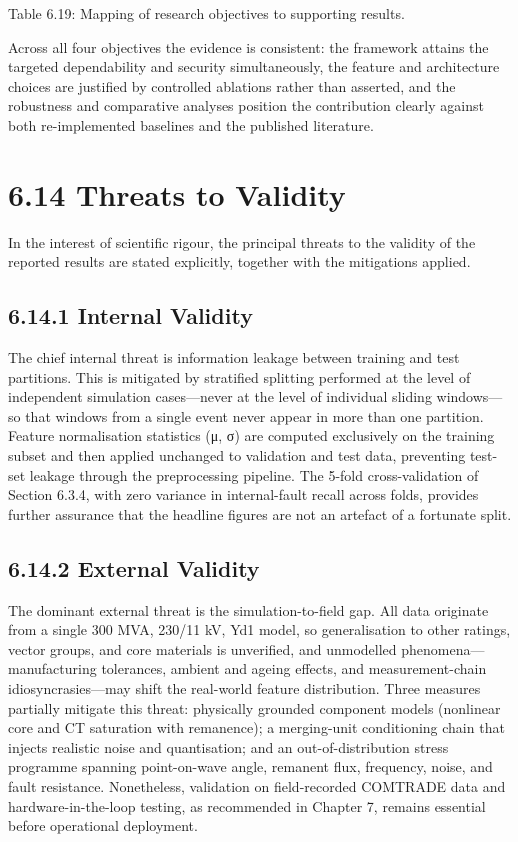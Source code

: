 Table 6.19: Mapping of research objectives to supporting results.

Across all four objectives the evidence is consistent: the framework attains the targeted dependability and security simultaneously, the feature and architecture choices are justified by controlled ablations rather than asserted, and the robustness and comparative analyses position the contribution clearly against both re-implemented baselines and the published literature.


\section{6.14  Threats to Validity}
In the interest of scientific rigour, the principal threats to the validity of the reported results are stated explicitly, together with the mitigations applied.


\subsection{6.14.1  Internal Validity}
The chief internal threat is information leakage between training and test partitions. This is mitigated by stratified splitting performed at the level of independent simulation cases---never at the level of individual sliding windows---so that windows from a single event never appear in more than one partition. Feature normalisation statistics (μ, σ) are computed exclusively on the training subset and then applied unchanged to validation and test data, preventing test-set leakage through the preprocessing pipeline. The 5-fold cross-validation of Section 6.3.4, with zero variance in internal-fault recall across folds, provides further assurance that the headline figures are not an artefact of a fortunate split.


\subsection{6.14.2  External Validity}
The dominant external threat is the simulation-to-field gap. All data originate from a single 300 MVA, 230/11 kV, Yd1 model, so generalisation to other ratings, vector groups, and core materials is unverified, and unmodelled phenomena---manufacturing tolerances, ambient and ageing effects, and measurement-chain idiosyncrasies---may shift the real-world feature distribution. Three measures partially mitigate this threat: physically grounded component models (nonlinear core and CT saturation with remanence); a merging-unit conditioning chain that injects realistic noise and quantisation; and an out-of-distribution stress programme spanning point-on-wave angle, remanent flux, frequency, noise, and fault resistance. Nonetheless, validation on field-recorded COMTRADE data and hardware-in-the-loop testing, as recommended in Chapter 7, remains essential before operational deployment.


